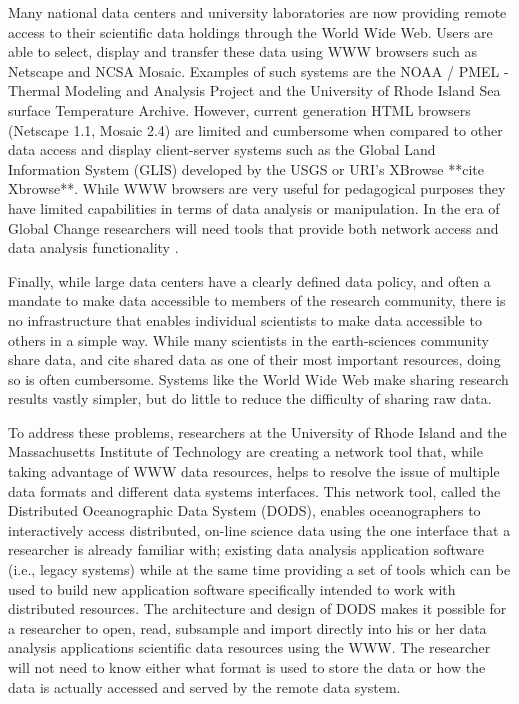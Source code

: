 Many national data centers and university laboratories are now providing
remote access to their scientific data holdings through the World Wide
Web. Users are able to select, display and transfer these data using WWW
browsers such as Netscape and NCSA Mosaic.  Examples of such systems are the
NOAA / PMEL - Thermal Modeling and Analysis Project\cite{PMEL:thermalurl} and
the University of Rhode Island Sea surface Temperature
Archive\cite{URI:ssturl}.  However, current generation HTML browsers
(Netscape 1.1, Mosaic 2.4) are limited and cumbersome when compared to other
data access and display client-server systems such as the Global Land
Information System (GLIS) developed by the USGS or URI's XBrowse **cite
Xbrowse**.  While WWW browsers are very useful for pedagogical purposes they
have limited capabilities in terms of data analysis or manipulation.  In the
era of Global Change researchers will need tools that provide both network
access and data analysis functionality
\cite{pursch:newtools}\cite{NSF:globalchange}.

Finally, while large data centers have a clearly defined data policy, and
often a mandate to make data accessible to members of the research
community\cite{NOAA:policy}, there is no infrastructure that enables
individual scientists to make data accessible to others in a simple
way. While many scientists in the earth-sciences community share data, and
cite shared data as one of their most important resources, doing so is often
cumbersome\cite{DODS:workshop1}. Systems like the World Wide Web make sharing
research results vastly simpler, but do little to reduce the difficulty of
sharing raw data.

To address these problems, researchers at the University of Rhode Island and
the Massachusetts Institute of Technology are creating a network tool that,
while taking advantage of WWW data resources, helps to resolve the issue of
multiple data formats and different data systems interfaces.  This network
tool, called the Distributed Oceanographic Data System (DODS), enables
oceanographers to interactively access distributed, on-line science data
using the one interface that a researcher is already familiar with; existing
data analysis application software (i.e., legacy systems) while at the same
time providing a set of tools which can be used to build new application
software specifically intended to work with distributed resources.  The
architecture and design of DODS makes it possible for a researcher to
open, read, subsample and import directly into his or her data analysis
applications scientific data resources using the WWW.  The researcher will not
need to know either what format is used to store the data or how the data is
actually accessed and served by the remote data system\cite{DODS:workshop1}.

